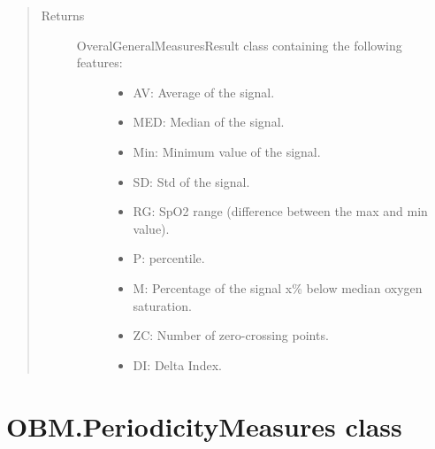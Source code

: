 \documentclass[letterpaper,10pt,english]{sphinxmanual}
\begin{document}
\begin{fulllineitems}
\begin{fulllineitems}
\begin{quote}
\begin{description}
\item[{Returns}] \leavevmode
\begin{description}
\item[{OveralGeneralMeasuresResult class containing the following features:}] \leavevmode\begin{itemize}
\item {} 
AV: Average of the signal.

\item {} 
MED: Median of the signal.

\item {} 
Min: Minimum value of the signal.

\item {} 
SD: Std of the signal.

\item {} 
RG: SpO2 range (difference between the max and min value).

\item {} 
P: percentile.

\item {} 
M: Percentage of the signal x\% below median oxygen saturation.

\item {} 
ZC: Number of zero-crossing points.

\item {} 
DI: Delta Index.

\end{itemize}

\end{description}


\end{description}\end{quote}

\end{fulllineitems}


\end{fulllineitems}



\section{OBM.PeriodicityMeasures class}
\label{\detokenize{OBM:module-OBM.PeriodicityMeasures}}\label{\detokenize{OBM:obm-periodicitymeasures-class}}
\end{document}
